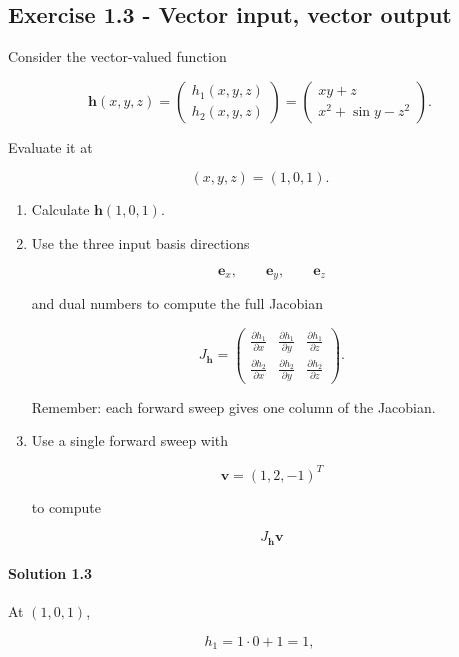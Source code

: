 \documentclass[10pt]{article}
\begin{document}
\subsection*{Exercise 1.3 - Vector input, vector output}
Consider the vector-valued function

\[
\mathbf{h}(x,y,z)
=
\begin{pmatrix}
 h_1(x,y,z)\\
 h_2(x,y,z)
\end{pmatrix}
=
\begin{pmatrix}
 xy+z\\
 x^2+\sin y-z^2
\end{pmatrix}.
\]

Evaluate it at

\[
(x,y,z)=(1,0,1).
\]

\begin{enumerate}
\item
Calculate $\mathbf h(1,0,1)$.

\item
Use the three input basis directions

\[
\mathbf e_x,
   \qquad
   \mathbf e_y,
   \qquad
   \mathbf e_z
\]

and dual numbers to compute the full Jacobian

\[
J_{\mathbf h}
   =
   \begin{pmatrix}
   \frac{\partial h_1}{\partial x} &
   \frac{\partial h_1}{\partial y} &
   \frac{\partial h_1}{\partial z}\\[4pt]
   \frac{\partial h_2}{\partial x} &
   \frac{\partial h_2}{\partial y} &
   \frac{\partial h_2}{\partial z}
   \end{pmatrix}.
\]

Remember: each forward sweep gives one column of the Jacobian.

\item
Use a single forward sweep with

\[
\mathbf v=(1,2,-1)^T
\]

to compute

\[
J_{\mathbf h}\mathbf v
\]

\end{enumerate}

\begingroup\color{red}
\paragraph*{Solution 1.3}
At $(1,0,1)$,

\[
h_1=1\cdot0+1=1,
\]
\end{document}
